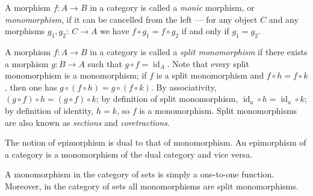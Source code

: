 \documentclass[12pt]{article}
\begin{document}
A morphism $f \colon A \to B$ in a category is called a {\em monic} morphism, or \emph{monomorphism}, if it can be cancelled from the left --- for any object $C$ and any morphisms $g_1, g_2 \colon\ C\to A$ we have $f \circ g_1 = f \circ g_2$ if and only if $g_1 = g_2$.

A morphism $f : A \to B$ in a category is called a \emph{split monomorphism}
if there exists a morphism $g \colon B \to A$ such that $g \circ f = \operatorname{id}_A$.  Note that every split monomorphism is a monomorphism;
if $f$ is a split monomorphism and $f \circ h = f \circ k$, then one has
$g \circ (f \circ h) = g \circ (f \circ k)$.  By associativity, $(g \circ f)
\circ h = (g \circ f) \circ k$; by definition of split monomorphism,
$\operatorname{id}_a \circ h = \operatorname{id}_a \circ k$; by definition of
identity, $h = k$, so $f$ is a monomorphism.  Split monomorphisms are also
known as \emph{sections} and \emph{coretractions}.

The notion of epimorphism is dual to that of monomorphism.  An epimorphism of
a category is a monomorphism of the dual category and vice versa.

A monomorphism in the category of sets is simply a one-to-one function.
Moreover, in the category of sets all monomorphisms are split monomorphisms.
\end{document}
